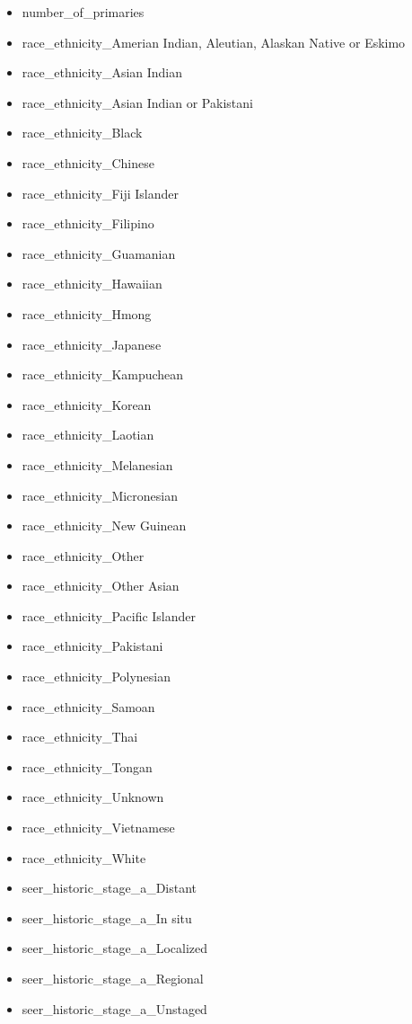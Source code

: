 \documentclass[a4paper,11pt]{article}
\begin{document}
\begin{itemize}[noitemsep]
\item number\_of\_primaries
\item race\_ethnicity\_Amerian Indian, Aleutian, Alaskan Native or Eskimo
\item race\_ethnicity\_Asian Indian
\item race\_ethnicity\_Asian Indian or Pakistani
\item race\_ethnicity\_Black
\item race\_ethnicity\_Chinese
\item race\_ethnicity\_Fiji Islander
\item race\_ethnicity\_Filipino
\item race\_ethnicity\_Guamanian
\item race\_ethnicity\_Hawaiian
\item race\_ethnicity\_Hmong
\item race\_ethnicity\_Japanese
\item race\_ethnicity\_Kampuchean
\item race\_ethnicity\_Korean
\item race\_ethnicity\_Laotian
\item race\_ethnicity\_Melanesian
\item race\_ethnicity\_Micronesian
\item race\_ethnicity\_New Guinean
\item race\_ethnicity\_Other
\item race\_ethnicity\_Other Asian
\item race\_ethnicity\_Pacific Islander
\item race\_ethnicity\_Pakistani
\item race\_ethnicity\_Polynesian
\item race\_ethnicity\_Samoan
\item race\_ethnicity\_Thai
\item race\_ethnicity\_Tongan
\item race\_ethnicity\_Unknown
\item race\_ethnicity\_Vietnamese
\item race\_ethnicity\_White
\item seer\_historic\_stage\_a\_Distant
\item seer\_historic\_stage\_a\_In situ
\item seer\_historic\_stage\_a\_Localized
\item seer\_historic\_stage\_a\_Regional
\item seer\_historic\_stage\_a\_Unstaged

\end{itemize}
\end{document}
